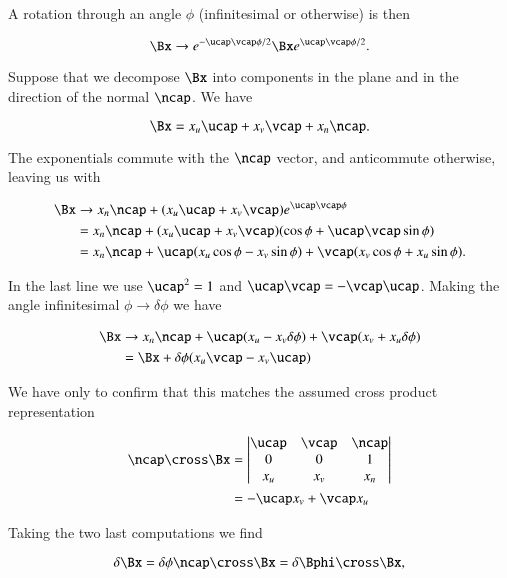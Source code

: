 A rotation through an angle $\phi$ (infinitesimal or otherwise) is then

\begin{equation}\label{eqn:continuumL6:90}
\Bx \rightarrow 
e^{-\ucap \vcap \phi/2} \Bx e^{\ucap \vcap \phi/2}.
\end{equation}

Suppose that we decompose $\Bx$ into components in the plane and in the direction of the normal $\ncap$.  We have

\begin{equation}\label{eqn:continuumL6:110}
\Bx = x_u \ucap + x_v \vcap + x_n \ncap.
\end{equation}

The exponentials commute with the $\ncap$ vector, and anticommute otherwise, leaving us with

\begin{align*}
\Bx 
&\rightarrow 
x_n \ncap + 
(x_u \ucap + x_v \vcap) e^{\ucap \vcap \phi} \\
&=
x_n \ncap + 
(x_u \ucap + x_v \vcap) (\cos\phi + \ucap \vcap \sin\phi) \\
&=
x_n \ncap + 
\ucap (x_u \cos\phi - x_v \sin\phi) 
+
\vcap (x_v \cos\phi + x_u \sin\phi).
\end{align*}

In the last line we use $\ucap^2 = 1$ and $\ucap \vcap = - \vcap \ucap$.  Making the angle infinitesimal $\phi \rightarrow \delta \phi$ we have

\begin{align*}
\Bx 
&\rightarrow 
x_n \ncap + 
\ucap (x_u - x_v \delta\phi) 
+
\vcap (x_v + x_u \delta\phi)  \\
&=
\Bx + \delta\phi( x_u \vcap - x_v \ucap)
\end{align*}

We have only to confirm that this matches the assumed cross product representation

\begin{align*}
\ncap \cross \Bx
&=
\begin{vmatrix}
\ucap & \vcap & \ncap \\
0 & 0 & 1 \\
x_u & x_v & x_n
\end{vmatrix} \\
&=
-\ucap x_v + \vcap x_u
\end{align*}

Taking the two last computations we find

\begin{equation}\label{eqn:continuumL6:130}
\delta \Bx = \delta \phi \ncap \cross \Bx = \delta \Bphi \cross \Bx,
\end{equation}

